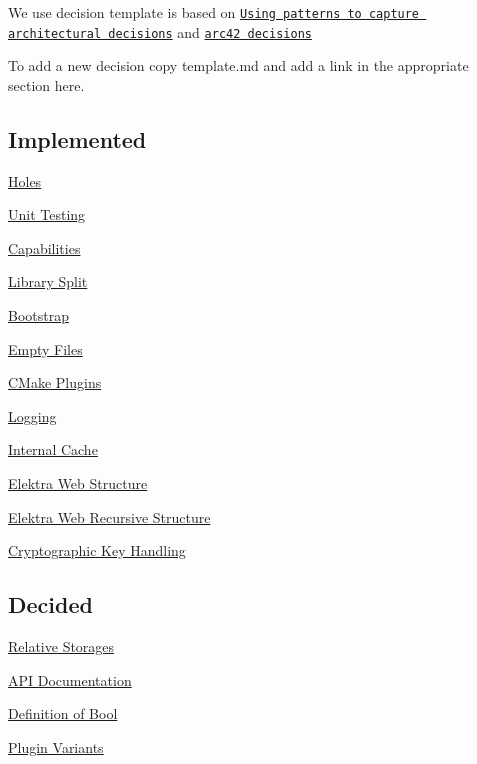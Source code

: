 We use decision template is based on \href{http://www.cs.rug.nl/~paris/papers/IEEESW07.pdf}{\tt Using patterns to capture architectural decisions} and \href{http://docs.arc42.org/section-9/}{\tt arc42 decisions}

To add a new decision copy template.\+md and add a link in the appropriate section here.

\subsection*{Implemented}


\begin{DoxyItemize}
\item \hyperlink{doc_decisions_holes_md}{Holes}
\item \hyperlink{doc_decisions_unit_testing_md}{Unit Testing}
\item \hyperlink{doc_decisions_capabilities_md}{Capabilities}
\item \hyperlink{doc_decisions_library_split_md}{Library Split}
\item \hyperlink{doc_decisions_bootstrap_md}{Bootstrap}
\item \hyperlink{doc_decisions_empty_files_md}{Empty Files}
\item \hyperlink{doc_decisions_cmake_plugins_md}{C\+Make Plugins}
\item \hyperlink{doc_decisions_logging_md}{Logging}
\item \hyperlink{doc_decisions_internal_cache_md}{Internal Cache}
\item \hyperlink{doc_decisions_elektra_web_md}{Elektra Web Structure}
\item \hyperlink{doc_decisions_elektra_web_recursive_md}{Elektra Web Recursive Structure}
\item \hyperlink{doc_decisions_cryptograhic_key_handling_md}{Cryptographic Key Handling}
\end{DoxyItemize}

\subsection*{Decided}


\begin{DoxyItemize}
\item \hyperlink{doc_decisions_relative_md}{Relative Storages}
\item \hyperlink{doc_decisions_api_documentation_md}{A\+PI Documentation}
\item \hyperlink{doc_decisions_bool_md}{Definition of Bool}
\item \hyperlink{doc_decisions_plugin_variants_md}{Plugin Variants}
\end{DoxyItemize}


